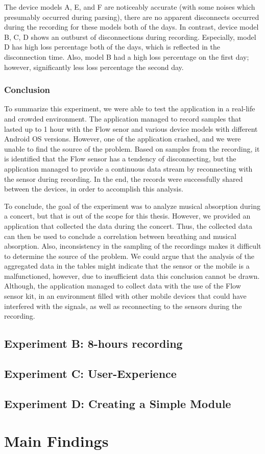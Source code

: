 The device models A, E, and F are noticeably accurate (with some noises which presumably occurred during parsing), there are no apparent disconnects occurred during the recording for these models both of the days. In contrast, device model B, C, D shows an outburst of disconnections during recording. Especially, model D has high loss percentage both of the days, which is reflected in the disconnection time. Also, model B had a high loss percentage on the first day; however, significantly less loss percentage the second day. 



\subsubsection{Conclusion}
To summarize this experiment, we were able to test the application in a real-life and crowded environment. The application managed to record samples that lasted up to 1 hour with the Flow senor and various device models with different Android OS versions. However, one of the application crashed, and we were unable to find the source of the problem. Based on samples from the recording, it is identified that the Flow sensor has a tendency of disconnecting, but the application managed to provide a continuous data stream by reconnecting with the sensor during recording. In the end, the records were successfully shared between the devices, in order to accomplish this analysis.  

To conclude, the goal of the experiment was to analyze musical absorption during a concert, but that is out of the scope for this thesis. However, we provided an application that collected the data during the concert. Thus, the collected data can then be used to conclude a correlation between breathing and musical absorption. Also, inconsistency in the sampling of the recordings makes it difficult to determine the source of the problem. We could argue that the analysis of the aggregated data in the tables might indicate that the sensor or the mobile is a malfunctioned, however, due to insufficient data this conclusion cannot be drawn. Although, the application managed to collect data with the use of the Flow sensor kit, in an environment filled with other mobile devices that could have interfered with the signals, as well as reconnecting to the sensors during the recording.

\subsection{Experiment B: 8-hours recording}
\subsection{Experiment C: User-Experience}

\subsection{Experiment D: Creating a Simple Module}



\section{Main Findings}
